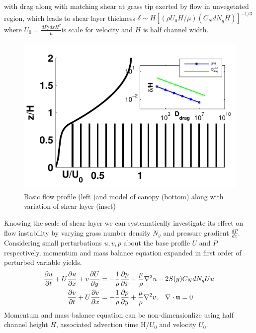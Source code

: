 \documentclass[aps,prl,twocolumn,showpacs,superscriptaddress,groupedaddress,10pt]{revtex4-1}  %
\newcommand{\bu}{\mathbf{u}}
\newcommand{\del}{\partial}
\begin{document}
with drag along with matching shear at grass tip exerted by flow in unvegetated region, which leads to shear layer 
thickness $\delta \sim  H\left[({\rho U_0 H}/\mu) (C_N d N_g H)\right]^{-1/3}$\normalsize where \small$U_0 = \frac{dP/dxH^2}{\mu}$\normalsize is scale for velocity and
$H$ is half channel width.
\begin{figure}[htb]
  \includegraphics[scale=0.8]{fig1}
\caption{Basic flow profile (left )and model of canopy (bottom) along with variation of shear layer (inset) }
\label{fig:basicflow}
\end{figure}
\newline
Knowing the scale of shear layer we can systematically investigate its effect on flow instability
by varying grass number density $N_g$ and pressure gradient $\frac{dP}{dx}$. Considering small perturbations $u, v, p$ about the base profile $U$ and $P$
respectively, momentum and mass balance equation expanded in first order of perturbed variable yields.
\small
\begin{equation}
\begin{split}
\frac{\del u}{\del t}+U\frac{\del u}{\del x}+v\frac{\del U}{\del y} &= -\frac{1}{\rho}\frac{\del p}{\del x}+\frac{\mu}{\rho}\nabla^2u-2S(y) C_{N}dN_{g}Uu\\
\frac{\del v}{\del  t}+ U\frac{\del v}{\del x} &= -\frac{1}{\rho}\frac{\del p}{\del y}+\frac{\mu}{\rho}\nabla^2v, \hspace{0.3cm} \nabla\cdot\bu=0\\
\end{split}
\end{equation}
\normalsize
Momentum and mass balance equation can be non-dimensionlize using half channel height $H$, associated advection time H/$U_0$ and velocity $U_0$.
\end{document}
